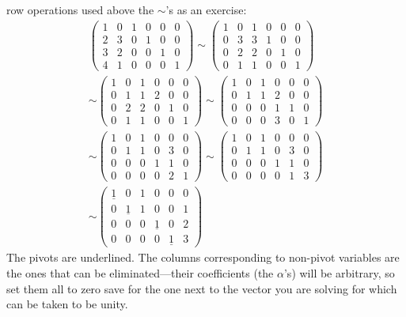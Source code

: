 {row operations used above the $\sim$'s as an exercise:
\begin{gather*}
\begin{pmatrix}
1&0&1&0&0&0\\
2&3&0&1&0&0\\
3&2&0&0&1&0\\
4&1&0&0&0&1
\end{pmatrix}\sim
\begin{pmatrix}
1&0&1&0&0&0\\
0&3&3&1&0&0\\
0&2&2&0&1&0\\
0&1&1&0&0&1
\end{pmatrix}
\\
\sim
\begin{pmatrix}
1&0&1&0&0&0\\
0&1&1&2&0&0\\
0&2&2&0&1&0\\
0&1&1&0&0&1
\end{pmatrix}
\sim
\begin{pmatrix}
1&0&1&0&0&0\\
0&1&1&2&0&0\\
0&0&0&1&1&0\\
0&0&0&3&0&1
\end{pmatrix}
\\
\sim
\begin{pmatrix}
1&0&1&0&0&0\\
0&1&1&0&3&0\\
0&0&0&1&1&0\\
0&0&0&0&2&1
\end{pmatrix}
\sim
\begin{pmatrix}
1&0&1&0&0&0\\
0&1&1&0&3&0\\
0&0&0&1&1&0\\
0&0&0&0&1&3
\end{pmatrix}
\\
\sim
\begin{pmatrix}
\underline1&0&1&0&0&0\\
0&\underline1&1&0&0&1\\
0&0&0&\underline1&0&2\\
0&0&0&0&\underline1&3
\end{pmatrix}
\end{gather*}
The pivots are underlined.
The columns corresponding to non-pivot variables are the ones that can be eliminated---their coefficients (the $\alpha$'s)
will be arbitrary, so set them all to zero save for the one next to the vector you are solving for which can be taken to be unity.
}
